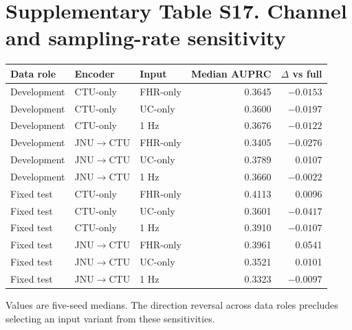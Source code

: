 \documentclass[11pt]{article}
\begin{document}
\section*{Supplementary Table S17. Channel and sampling-rate sensitivity}
\begin{tabular}{lllrr}
\toprule
Data role & Encoder & Input & Median AUPRC & $\Delta$ vs full \\
\midrule
Development & CTU-only & FHR-only & 0.3645 & $-0.0153$ \\
Development & CTU-only & UC-only & 0.3600 & $-0.0197$ \\
Development & CTU-only & 1 Hz & 0.3676 & $-0.0122$ \\
Development & JNU$\rightarrow$CTU & FHR-only & 0.3405 & $-0.0276$ \\
Development & JNU$\rightarrow$CTU & UC-only & 0.3789 & 0.0107 \\
Development & JNU$\rightarrow$CTU & 1 Hz & 0.3660 & $-0.0022$ \\
Fixed test & CTU-only & FHR-only & 0.4113 & 0.0096 \\
Fixed test & CTU-only & UC-only & 0.3601 & $-0.0417$ \\
Fixed test & CTU-only & 1 Hz & 0.3910 & $-0.0107$ \\
Fixed test & JNU$\rightarrow$CTU & FHR-only & 0.3961 & 0.0541 \\
Fixed test & JNU$\rightarrow$CTU & UC-only & 0.3521 & 0.0101 \\
Fixed test & JNU$\rightarrow$CTU & 1 Hz & 0.3323 & $-0.0097$ \\
\bottomrule
\end{tabular}

Values are five-seed medians. The direction reversal across data roles precludes selecting an input variant from these sensitivities.
\end{document}
